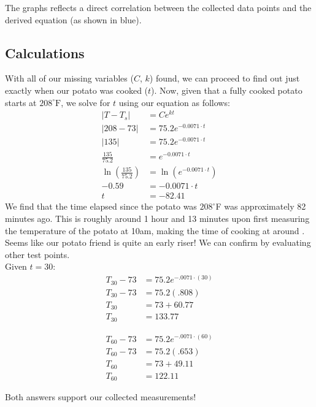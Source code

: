 \documentclass{article}
\begin{document}
The graphs reflects a direct correlation between the collected data points and the derived equation (as shown in blue).

\newpage
\subsection{Calculations}
With all of our missing variables ($C$, $k$) found, we can proceed to find out just exactly when our potato was cooked ($t$). Now, given that a fully cooked potato starts at $208^\circ\text{F}$, we solve for $t$ using our equation as follows:
\begin{align}
    |T-T_s| &= Ce^{kt}\\[1em]
    |208 - 73| &= 75.2e^{-0.0071\cdot t}\\[1em]
    |135| &=  75.2e^{-0.0071\cdot t}\\[1em]
    \frac{135}{75.2} &= e^{-0.0071\cdot t}\\[1em]
    \ln{\left(\frac{135}{75.2}\right)} &= \ln{\left(e^{-0.0071\cdot t}\right)}\\[1em]
    -0.59 &= -0.0071\cdot t\\[1em]
    t &= -82.41
\end{align}
We find that the time elapsed since the potato was $208^\circ$F was approximately 82 minutes ago. This is roughly around 1 hour and 13 minutes upon first measuring the temperature of the potato at 10am, making the time of cooking at around  . Seems like our potato friend is quite an early riser! We can confirm by evaluating other test points.\\ 

Given $t=30$:
\begin{align}
    T_{30}-73 &= 75.2e^{-.0071\cdot(30)}\\
    T_{30}-73 &= 75.2(.808)\\
    T_{30} &= 73+60.77\\
    T_{30} &= 133.77
\end{align}


\begin{align}
    T_{60}-73 &= 75.2e^{-.0071\cdot(60)}\\
    T_{60}-73 &= 75.2(.653)\\
    T_{60} &= 73+49.11\\
    T_{60} &= 122.11
\end{align}

Both answers support our collected measurements!
\end{document}

